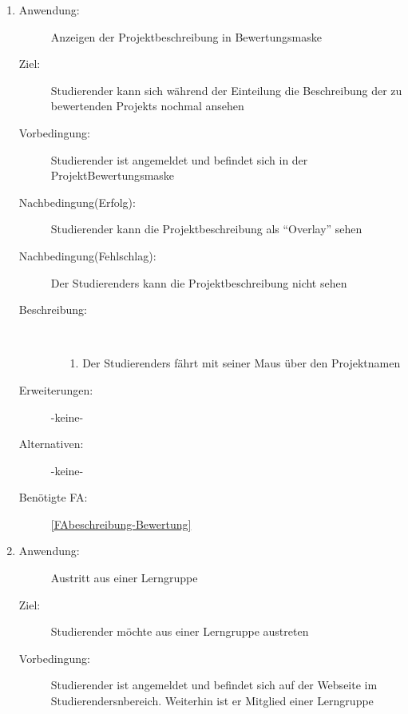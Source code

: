 \documentclass[parskip=full]{scrartcl}
\newcommand{\swtLabel}[1]{\textbf{/#1\arabic*0/}}
\begin{document}
\begin{enumerate}[label=\swtLabel{S}]
  
    \item \label{UCstudProjektbeschreibung}
  \begin{description}
  \item[Anwendung:] Anzeigen der \gls{Projekt}beschreibung in \gls{Bewertung}smaske
  \item[Ziel:] \gls{Studierender} kann sich während der \gls{Einteilung} die Beschreibung
  der zu bewertenden \glspl{Projekt} nochmal ansehen
  	\item[Vorbedingung:] \gls{Studierender} ist angemeldet und befindet sich in der
  	Projekt\gls{Bewertung}smaske %
  	
  	\item[Nachbedingung(Erfolg):] \gls{Studierender} kann die \gls{Projekt}beschreibung als
  	\enquote{Overlay} sehen %
  	
  	\item[Nachbedingung(Fehlschlag):] Der \glspl{Studierender} kann die
  	Projektbeschreibung nicht sehen
  	\item[Beschreibung:]~
  	\begin{enumerate}
  	  \item[1.] Der \glspl{Studierender} fährt mit seiner Maus über den \gls{Projekt}namen
 
  	\end{enumerate}
  	\item[Erweiterungen:] -keine-

  	\item[Alternativen:] -keine-

  	 \item[Benötigte FA:] \ref{FAbeschreibung-Bewertung}
  \end{description}
  
      \item \label{UCstudLeaveLernG}
  \begin{description}
  \item[Anwendung:] Austritt aus einer \gls{Lerngruppe}
  \item[Ziel:] \gls{Studierender} möchte aus einer \gls{Lerngruppe} austreten
  	\item[Vorbedingung:] \gls{Studierender} ist angemeldet und befindet sich auf der
  	Webseite im \glspl{Studierender}nbereich. Weiterhin ist er Mitglied
  	einer \gls{Lerngruppe}
  	

\end{description}
\end{enumerate}
\end{document}
